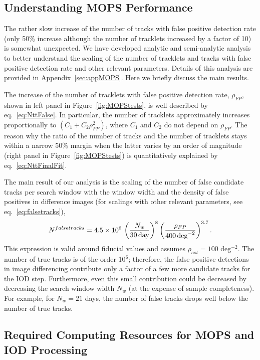 \subsection{Understanding MOPS Performance} 

The rather slow increase of the number of tracks with false positive detection rate (only 50\% increase 
although the number of tracklets increased by a factor of 10) is somewhat unexpected. We have 
developed analytic and semi-analytic analysis to better understand the scaling of the number of 
tracklets and tracks with false positive detection rate and other relevant parameters. Details of this
analysis are provided in Appendix~\ref{sec:appMOPS}. Here we briefly discuss the main results. 

The increase of the number of tracklets with false positive detection rate, $\rho_{FP}$, shown in left panel
in Figure~\ref{fig:MOPStests}, is well described by eq.~\ref{eq:NttFalse}. In particular, the number of tracklets 
approximately increases proportionally to $(C_1 + C_2\rho_{FP}^2)$, where $C_1$ and $C_2$ do not
depend on $\rho_{FP}$. The reason why the ratio of the number of tracks and the number of tracklets
stays within a narrow 50\% margin when the latter varies by an order of magnitude (right panel
in Figure~\ref{fig:MOPStests}) is quantitatively explained by eq.~\ref{eq:NttFinalFit}. 

The main result of our analysis is the scaling of the number of false candidate tracks per search window 
with the window width and the density of false positives in difference images (for scalings with other relevant 
parameters, see eq.~\ref{eq:falsetracks}), 
\begin{equation}  
\label{eq:falsetracks2}
   N^{falsetracks} = 4.5 \times 10^6 \, \left( {N_w \over 30 \, {\rm day} } \right)^{8} \left( {\rho_{FP} \over 400 \, {\rm deg}^{-2} }\right)^{3.7}. 
\end{equation} 
This expression is valid around fiducial values and assumes $\rho_{ast}=100$ deg$^{-2}$.
The number of true tracks is of the order 10$^6$; therefore, the false positive detections
in image differencing contribute only a factor of a few more candidate tracks for the IOD step. 
Furthermore, even this small contribution could be decreased by decreasing the search window
width $N_w$ (at the expense of sample completeness). For example, for $N_w=21$ days,
the number of false tracks drops well below the number of true tracks.


\subsection{Required Computing Resources for MOPS and IOD Processing} 

